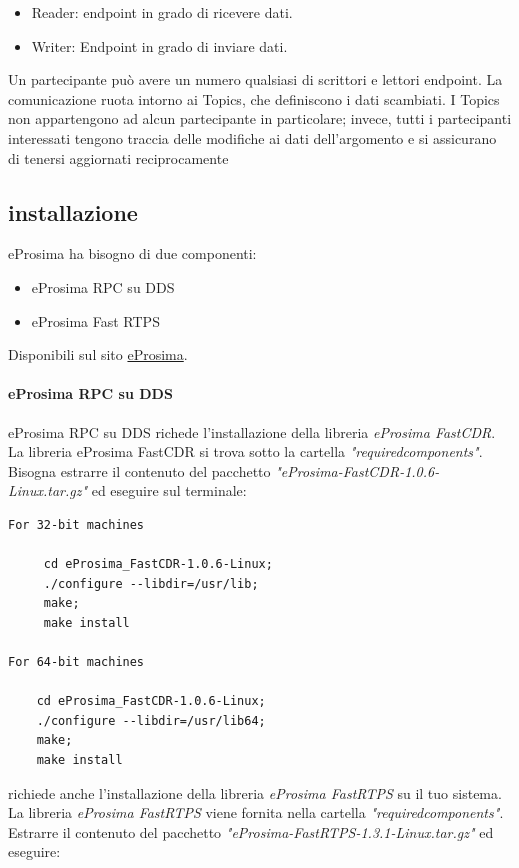 \documentclass[a4paper]{article}
\begin{document}
\begin{itemize}
\item Reader: endpoint in grado di ricevere dati.

\item Writer: Endpoint in grado di inviare dati.
\end{itemize}

Un partecipante può avere un numero qualsiasi di scrittori e lettori endpoint.
La comunicazione ruota intorno ai Topics, che definiscono i dati scambiati. I Topics non appartengono ad alcun partecipante in particolare; invece, tutti i partecipanti interessati tengono traccia delle modifiche ai dati dell'argomento e si assicurano di tenersi aggiornati reciprocamente
\subsection{installazione}
eProsima ha bisogno di due componenti:
\begin{itemize}
\item eProsima RPC su DDS
\item eProsima Fast RTPS
\end{itemize}

Disponibili sul sito \href{https://www.eprosima.com/}{eProsima}.
\paragraph{eProsima RPC su DDS}
eProsima RPC su DDS richede l'installazione della libreria \textit{eProsima FastCDR}. La libreria eProsima FastCDR si trova sotto la cartella
\textit{"requiredcomponents"}. Bisogna estrarre il contenuto del pacchetto \textit{"eProsima-FastCDR-1.0.6-Linux.tar.gz"}
ed eseguire sul terminale:
\begin{verbatim}
For 32-bit machines

     cd eProsima_FastCDR-1.0.6-Linux;
     ./configure --libdir=/usr/lib;
     make; 
     make install
     
For 64-bit machines

    cd eProsima_FastCDR-1.0.6-Linux; 
    ./configure --libdir=/usr/lib64;
    make;
    make install
\end{verbatim}
richiede anche l'installazione della libreria \textit{eProsima FastRTPS} su
il tuo sistema. La libreria \textit{eProsima FastRTPS} viene fornita nella cartella
\textit{"requiredcomponents"}. Estrarre il contenuto del pacchetto
\textit{"eProsima-FastRTPS-1.3.1-Linux.tar.gz"} ed eseguire:
\end{document}
